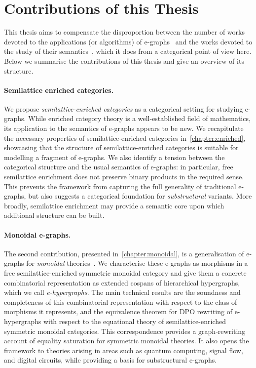\section*{Contributions of this Thesis}
This thesis aims to compensate the disproportion between the number of works devoted to the applications (or algorithms) of e-graphs~\cite{EggPaper,slotted-egraphs,singher2023colored,koehler2022sketchguided,Caviar,EqualitySaturationTensorGraphSuperoptimization} and the works devoted to the study of their semantics~\cite{zhang_relational_2022,tree_automata_e_graphs, EggsAreAdhesive}, which it does from a categorical point of view here.
Below we summarise the contributions of this thesis and give an overview of its structure.

\paragraph{Semilattice enriched categories.}
We propose \emph{semilattice-enriched categories} as a categorical setting for studying e-graphs.
While enriched category theory is a well-established field of mathematics, its application to the semantics of e-graphs appears to be new.
We recapitulate the necessary properties of semilattice-enriched categories in~\cref{chapter:enriched}, showcasing that the structure of semilattice-enriched categories is suitable for modelling a fragment of e-graphs.
We also identify a tension between the categorical structure and the usual semantics of e-graphs: in particular, free semilattice enrichment does not preserve binary products in the required sense.
This prevents the framework from capturing the full generality of traditional e-graphs, but also suggests a categorical foundation for \emph{substructural} variants.
More broadly, semilattice enrichment may provide a semantic core upon which additional structure can be built.

\paragraph{Monoidal e-graphs.}
The second contribution, presented in~\cref{chapter:monoidal}, is a generalisation of e-graphs for \emph{monoidal} theories~\cite{tiurin2025equivalencehypergraphsdporewriting}.
We characterise these e-graphs as morphisms in a free semilattice-enriched symmetric monoidal category and give them a concrete combinatorial representation as extended cospans of hierarchical hypergraphs, which we call \emph{e-hypergraphs}.
The main technical results are the soundness and completeness of this combinatorial representation with respect to the class of morphisms it represents, and
the equivalence theorem for DPO rewriting of e-hypergraphs with respect to the equational theory of semilattice-enriched symmetric monoidal categories.
This correspondence provides a graph-rewriting account of equality saturation for symmetric monoidal theories.
It also opens the framework to theories arising in areas such as quantum computing, signal flow, and digital circuits, while providing a basis for substructural e-graphs.



